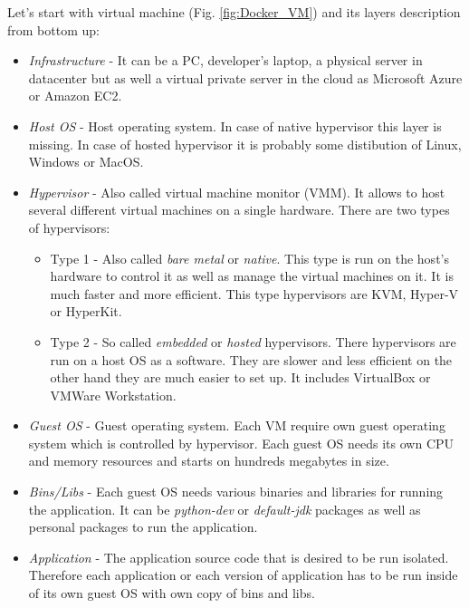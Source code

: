 \documentclass[12pt,a4paper]{article}
\begin{document}
\noindent
Let's start with virtual machine (Fig. \ref{fig:Docker_VM}) and its layers description from bottom up:
\begin{itemize}
\item \textit{Infrastructure} - It can be a PC, developer's laptop, a physical server in datacenter but as well a virtual private
server in the cloud as Microsoft Azure or Amazon EC2.
\item \textit{Host OS} - Host operating system. In case of native hypervisor this layer is missing. In case of hosted hypervisor
it is probably some distibution of Linux, Windows or MacOS.
\item \textit{Hypervisor} - Also called virtual machine monitor (VMM). It allows to host several different virtual machines
on a single hardware. There are two types of hypervisors:
\begin{itemize}
\item Type 1 -  Also called \textit{bare metal} or \textit{native}. This type is run on the host's hardware to control it as well as manage 
the virtual machines on it. It is much faster and more efficient. This type hypervisors are KVM, Hyper-V or HyperKit.
\item Type 2 - So called \textit{embedded} or \textit{hosted} hypervisors. There hypervisors are run on a host OS as a software. They are slower
and less efficient on the other hand they are much easier to set up. It includes VirtualBox or VMWare Workstation.
\end{itemize}
\item \textit{Guest OS} - Guest operating system. Each VM require own guest operating system which is controlled by hypervisor. Each 
guest OS needs its own CPU and memory resources and starts on hundreds megabytes in size.
\item \textit{Bins/Libs} - Each guest OS needs various binaries and libraries for running the application. It can be \textit{python-dev} or \textit{default-jdk} packages as well as personal packages to run the application.
\item \textit{Application} - The application source code that is desired to be run isolated. Therefore each application or each version of application has to be run inside of its own guest OS with own copy of bins and libs. 
\end{itemize}
\end{document}
